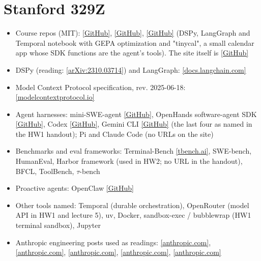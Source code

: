\documentclass[10pt,oneside]{report}
\begin{document}
\section{Stanford 329Z}
{\small\begin{itemize}
\item Course repos (MIT): \href{https://github.com/cs329z/assignment1-harness}{[GitHub]}, \href{https://github.com/cs329z/assignment2-evals}{[GitHub]}, \href{https://github.com/cs329z/lecture5-frameworks}{[GitHub]} (DSPy, LangGraph and Temporal notebook with GEPA optimization and "tinycal", a small calendar app whose SDK functions are the agent's tools). The site itself is \href{https://github.com/cs329z/cs329z.github.io}{[GitHub]}
\item DSPy (reading: \href{https://arxiv.org/abs/2310.03714}{[arXiv:2310.03714]}) and LangGraph: \href{https://docs.langchain.com/oss/python/langgraph/overview}{[docs.langchain.com]}
\item Model Context Protocol specification, rev. 2025-06-18: \href{https://modelcontextprotocol.io/specification/2025-06-18}{[modelcontextprotocol.io]}
\item Agent harnesses: mini-SWE-agent \href{https://github.com/SWE-agent/mini-swe-agent}{[GitHub]}, OpenHands software-agent SDK \href{https://github.com/OpenHands/software-agent-sdk}{[GitHub]}, Codex \href{https://github.com/openai/codex}{[GitHub]}, Gemini CLI \href{https://github.com/google-gemini/gemini-cli}{[GitHub]} (the last four as named in the HW1 handout); Pi and Claude Code (no URLs on the site)
\item Benchmarks and eval frameworks: Terminal-Bench \href{https://www.tbench.ai/}{[tbench.ai]}, SWE-bench, HumanEval, Harbor framework (used in HW2; no URL in the handout), BFCL, ToolBench, $\tau$-bench
\item Proactive agents: OpenClaw \href{https://github.com/openclaw/openclaw}{[GitHub]}
\item Other tools named: Temporal (durable orchestration), OpenRouter (model API in HW1 and lecture 5), uv, Docker, sandbox-exec / bubblewrap (HW1 terminal sandbox), Jupyter
\item Anthropic engineering posts used as readings: \href{https://www.anthropic.com/engineering/building-effective-agents}{[anthropic.com]}, \href{https://www.anthropic.com/engineering/effective-context-engineering-for-ai-agents}{[anthropic.com]}, \href{https://www.anthropic.com/engineering/demystifying-evals-for-ai-agents}{[anthropic.com]}, \href{https://www.anthropic.com/engineering/claude-code-best-practices}{[anthropic.com]}, \href{https://www.anthropic.com/engineering/effective-harnesses-for-long-running-agents}{[anthropic.com]}
\end{itemize}}
\end{document}

